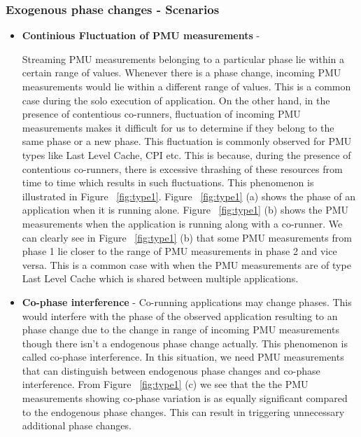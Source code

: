 \documentclass{sig-alternate}
\begin{document}
\subsubsection{Exogenous phase changes - Scenarios}
\label{subsubsec:Exogenousphasechanges-Scenarios}

\begin{itemize}
\item \textbf{Continious Fluctuation of PMU measurements} - 

Streaming PMU measurements belonging to a particular phase lie within a certain range of values. Whenever there is a phase change, incoming PMU measurements would lie within a different range of values. This is a common case during the solo execution of application. On the other hand, in the presence of contentious co-runners, fluctuation of incoming PMU measurements makes it difficult for us to determine if they belong to the same phase or a new phase. This fluctuation is commonly observed for PMU types like Last Level Cache, CPI etc. This is because, during the presence of contentious co-runners, there is excessive thrashing of these resources from time to time which results in such fluctuations. This phenomenon is illustrated in Figure ~\ref{fig:type1}. Figure ~\ref{fig:type1} (a) shows the phase of an application when it is running alone. Figure ~\ref{fig:type1} (b) shows the PMU measurements when the application is running along with a co-runner. We can clearly see in Figure ~\ref{fig:type1} (b) that some PMU measurements from phase 1 lie closer to the range of PMU measurements in phase 2 and vice versa. This is a common case with when the PMU measurements are of type Last Level Cache which is shared between multiple applications. 

\item \textbf{Co-phase interference} -  Co-running applications may change phases. This would interfere with the phase of the observed application resulting to an phase change due to the change in range of incoming PMU measurements though there isn't a endogenous phase change actually. This phenomenon is called co-phase interference. In this situation, we need PMU measurements that can distinguish between endogenous phase changes and co-phase interference.  From Figure ~\ref{fig:type1} (c) we see that the the PMU measurements showing co-phase variation is as equally significant compared to the endogenous phase changes. This can result in triggering unnecessary additional phase changes.
\end{itemize}
\end{document}
